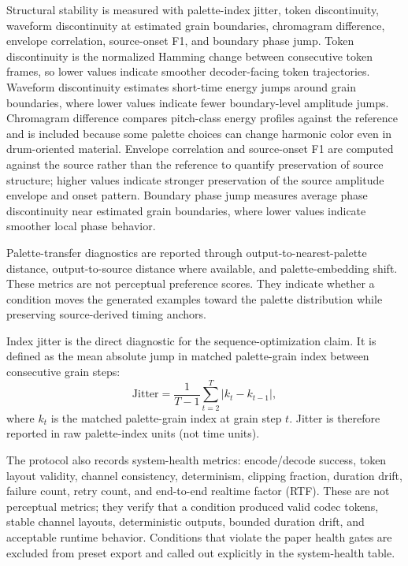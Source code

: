 \documentclass[twoside,a4paper]{article}
\begin{document}
Structural stability is measured with palette-index jitter, token discontinuity, waveform discontinuity at estimated grain boundaries, chromagram difference, envelope correlation, source-onset F1, and boundary phase jump. Token discontinuity is the normalized Hamming change between consecutive token frames, so lower values indicate smoother decoder-facing token trajectories. Waveform discontinuity estimates short-time energy jumps around grain boundaries, where lower values indicate fewer boundary-level amplitude jumps. Chromagram difference compares pitch-class energy profiles against the reference and is included because some palette choices can change harmonic color even in drum-oriented material. Envelope correlation and source-onset F1 are computed against the source rather than the reference to quantify preservation of source structure; higher values indicate stronger preservation of the source amplitude envelope and onset pattern. Boundary phase jump measures average phase discontinuity near estimated grain boundaries, where lower values indicate smoother local phase behavior.

Palette-transfer diagnostics are reported through output-to-nearest-palette distance, output-to-source distance where available, and palette-embedding shift. These metrics are not perceptual preference scores. They indicate whether a condition moves the generated examples toward the palette distribution while preserving source-derived timing anchors.

Index jitter is the direct diagnostic for the sequence-optimization claim. It is defined as the mean absolute jump in matched palette-grain index between consecutive grain steps:
\begin{equation}
\mathrm{Jitter} = \frac{1}{T-1}\sum_{t=2}^{T} \left|k_t-k_{t-1}\right|,
\end{equation}
where $k_t$ is the matched palette-grain index at grain step $t$. Jitter is therefore reported in raw palette-index units (not time units).

The protocol also records system-health metrics: encode/decode success, token layout validity, channel consistency, determinism, clipping fraction, duration drift, failure count, retry count, and end-to-end realtime factor (RTF). These are not perceptual metrics; they verify that a condition produced valid codec tokens, stable channel layouts, deterministic outputs, bounded duration drift, and acceptable runtime behavior. Conditions that violate the paper health gates are excluded from preset export and called out explicitly in the system-health table.
\end{document}
